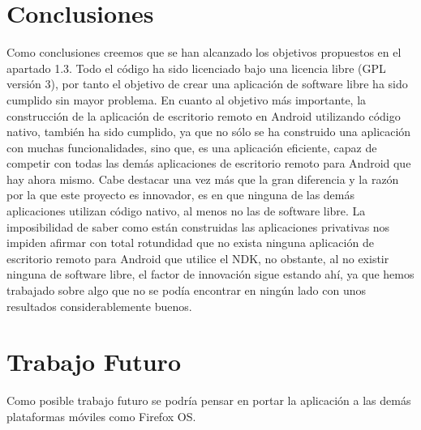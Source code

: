 \section{Conclusiones}
Como conclusiones creemos que se han alcanzado los objetivos propuestos en el apartado 1.3. Todo el código ha sido licenciado bajo una licencia libre (GPL versión 3), por tanto el objetivo de crear una aplicación de software libre ha sido cumplido sin mayor problema. En cuanto al objetivo más importante, la construcción de la aplicación de escritorio remoto en Android utilizando código nativo, también ha sido cumplido, ya que no sólo se ha construido una aplicación con muchas funcionalidades, sino que, es una aplicación eficiente, capaz de competir con todas las demás aplicaciones de escritorio remoto para Android que hay ahora mismo. Cabe destacar una vez más que la gran diferencia y la razón por la que este proyecto es innovador, es en que ninguna de las demás aplicaciones utilizan código nativo, al menos no las de software libre. La imposibilidad de saber como están construidas las aplicaciones privativas nos impiden afirmar con total rotundidad que no exista ninguna aplicación de escritorio remoto para Android que utilice el NDK, no obstante, al no existir ninguna de software libre, el factor de innovación sigue estando ahí, ya que hemos trabajado sobre algo que no se podía encontrar en ningún lado con unos resultados considerablemente buenos.

\section{Trabajo Futuro}

Como posible trabajo futuro se podría pensar en portar la aplicación a las demás plataformas móviles como Firefox OS. 
